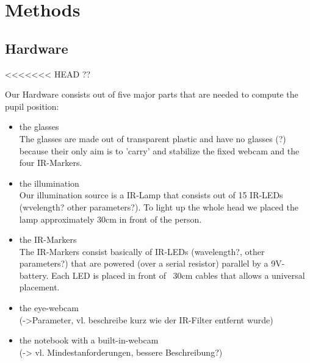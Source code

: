 \section{Methods}\label{methods}

\subsection{Hardware}
<<<<<<< HEAD ??

Our Hardware consists out of five major parts that are needed to compute the pupil position:

\begin{itemize}
  \item the glasses\\
  The glasses are made out of transparent plastic and have no glasses (?) because their only aim is to 'carry' and stabilize the fixed webcam and the four IR-Markers.

  \item the illumination\\
Our illumination source is a IR-Lamp that consists out of 15 IR-LEDs (wvelength? other parameters?). To light up the whole head we placed the lamp approximately 30cm in front of the person.

  \item the IR-Markers\\
The IR-Markers consist basically of IR-LEDs (wavelength?, other parameters?) that are powered (over a serial resistor) parallel by a 9V-battery. Each LED is placed in front of ~30cm cables that allows a universal placement. 

  \item the eye-webcam\\ 
(->Parameter, vl. beschreibe kurz wie der IR-Filter entfernt wurde)

  \item the notebook with a built-in-webcam\\
(-> vl. Mindestanforderungen, bessere Beschreibung?)


\end{itemize}
